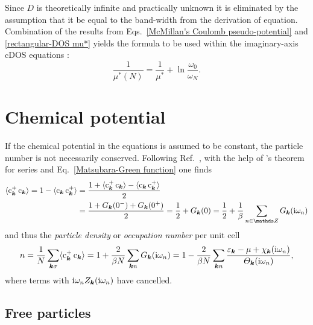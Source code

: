 Since $D$ is theoretically infinite and practically unknown it is eliminated by
the assumption that it be equal to the band-width from the derivation of
 equation. Combination of the results from Eqs.~\ref{McMillan's
Coulomb pseudo-potential} and \ref{rectangular-DOS mu*} yields the formula to be
used within the imaginary-axis cDOS  equations
\cite[Eq.~13]{AllenDynes75}:
%
\begin{equation*}
    \frac 1 {\mu^*(N)} = \frac 1 {\mu^*} + \ln \frac{\omega_0}{\omega_N}.
\end{equation*}

\section{Chemical potential}
\label{chemical potential}

If the chemical potential in the  equations is assumed to be
constant, the particle number is not necessarily conserved. Following
Ref.~, with the help of
's theorem for  series and
Eq.~\ref{Matsubara-Green function} one finds
%
\begin{align*}
    \av{\op c_{\vec k}^+ \, \op c_{\vec k}}
    = 1 - \av{\op c_{\vec k} \, \op c_{\vec k}^+}
    &= \frac { 1
        + \av{\op c_{\vec k}^+ \, \op c_{\vec k}}
        - \av{\op c_{\vec k} \, \op c_{\vec k}^+}
        } 2
    \\
    &= \frac {1 + G_{\vec k}(0^-) + G_{\vec k}(0^+)} 2
    = \frac 1 2 + G_{\vec k}(0)
    = \frac 1 2 + \frac 1 \beta \sum_{n \in \mathds Z} G_{\vec k}(\I \omega_n)
\end{align*}
%
and thus the \emph{particle density} or \emph{occupation number} per unit cell
%
\begin{equation*}
    n = \frac 1 N \sum_{\boldsymbol k \sigma} \langle\mathrm c_{\boldsymbol k}^+ \, \mathrm c_{\boldsymbol k}\rangle
    = 1 + \frac 2 {\beta N} \sum_{\boldsymbol k n} G_{\boldsymbol k}(\mathrm i \omega_n)
    = 1 - \frac 2 {\beta N} \sum_{\boldsymbol k n} \frac
        {\varepsilon_{\boldsymbol k} - \mu + \chi_{\boldsymbol k}(\mathrm i \omega_n)}
        {\varTheta_{\boldsymbol k}(\mathrm i \omega_n)},
\end{equation*}
%
where terms with $\mathrm i \omega_n Z_{\boldsymbol k}(\mathrm i \omega_n)$ have cancelled.

\subsection{Free particles}

